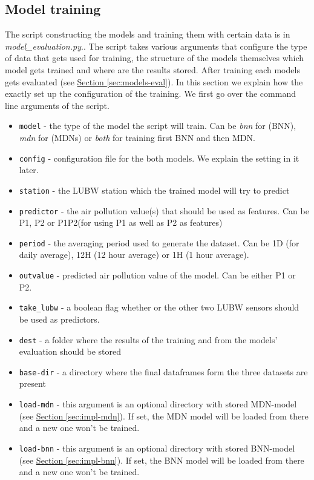 \documentclass[12pt,a4paper,twoside]{scrartcl}
\numberwithin{equation}{section}
\newcommand{\refsec}[1]{\hyperref[#1]{Section \ref*{#1}}}
\begin{document}
\subsection{Model training}
\label{sec:models-train}
The script constructing the models and training them with certain data is in \emph{model_evaluation.py}.. The script takes various arguments that configure the type of data that gets used for training, the structure of the models themselves which model gets trained and where are the results stored. After training each models gets evaluated (see \refsec{sec:models-eval}). In this section we explain how the exactly set up the configuration of the training. We first go over the command line arguments of the script.
\begin{itemize}
\item \texttt{\-\-model} - the type of the model the script will train. Can be \emph{bnn} for (BNN), \emph{mdn} for (MDNs) or \emph{both} for training first BNN and then MDN.
\item \texttt{\-\-config} - configuration file for the both models. We explain the setting in it later.
\item \texttt{\-\-station} - the LUBW station which the trained model will try to predict
\item \texttt{\-\-predictor} - the air pollution value(s) that should be used as features. Can be P1, P2 or P1P2(for using P1 as well as P2 as features)
\item \texttt{\-\-period} - the averaging period used to generate the dataset. Can be 1D (for daily average), 12H (12 hour average) or 1H (1 hour average).
\item \texttt{\-\-outvalue} - predicted air pollution value of the model. Can be either P1 or P2.
\item \texttt{\-\-take_lubw} - a boolean flag whether or the other two LUBW sensors should be used as predictors.
\item \texttt{\-\-dest} - a folder where the results of the training and from the models' evaluation should be stored
\item \texttt{\-\-base-dir} - a directory where the final dataframes form the three datasets are present
\item \texttt{\-\-load-mdn} - this argument is an optional directory with stored MDN-model (see \refsec{sec:impl-mdn}). If set, the MDN model will be loaded from there and a new one won't be trained.
\item \texttt{\-\-load-bnn} - this argument is an optional directory with stored BNN-model (see \refsec{sec:impl-bnn}). If set, the BNN model will be loaded from there and a new one won't be trained.
\end{itemize}
\end{document}
